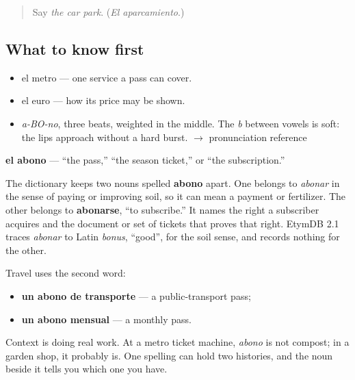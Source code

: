 \label{lesson:ES-C400-abono}



\begin{quote}
Say \emph{the car park}. (\emph{El aparcamiento}.)
\end{quote}

\subsection*{What to know first}
\begin{itemize}
\raggedright
  \item el metro — one service a pass can cover.
  \item el euro — how its price may be shown.
\end{itemize}

\begin{sounds}
\begin{itemize}
\raggedright
  \item \emph{a-BO-no}, three beats, weighted in the middle. The \emph{b} between vowels is soft: the lips approach without a hard burst. $\to$ pronunciation reference
\end{itemize}
\end{sounds}

\begin{cousinweb}
\textbf{el abono} — \textquotedblleft{}the pass,\textquotedblright{} \textquotedblleft{}the season ticket,\textquotedblright{} or \textquotedblleft{}the subscription.\textquotedblright{}

The dictionary keeps two nouns spelled \textbf{abono} apart. One belongs to \emph{abonar} in the sense of paying or improving soil, so it can mean a payment or fertilizer. The other belongs to \textbf{abonarse}, \textquotedblleft{}to subscribe.\textquotedblright{} It names the right a subscriber acquires and the document or set of tickets that proves that right. EtymDB 2.1 traces \emph{abonar} to Latin \emph{bonus}, \textquotedblleft{}good\textquotedblright{}, for the soil sense, and records nothing for the other.

Travel uses the second word:

\begin{itemize}
\raggedright
  \item \textbf{un abono de transporte} — a public-transport pass;
  \item \textbf{un abono mensual} — a monthly pass.
\end{itemize}

Context is doing real work. At a metro ticket machine, \emph{abono} is not compost; in a garden shop, it probably is. One spelling can hold two histories, and the noun beside it tells you which one you have.
\end{cousinweb}

